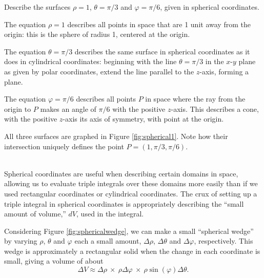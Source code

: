 {Describe the surfaces $\rho=1$, $\theta = \pi/3$ and $\varphi = \pi/6$, given in spherical coordinates.
}
{The equation $\rho = 1$ describes all points in space that are 1 unit away from the origin: this is the sphere of radius 1, centered at the origin.

The equation $\theta = \pi/3$ describes the same surface in spherical coordinates as it does in cylindrical coordinates: beginning with the line $\theta = \pi/3$ in the $x$-$y$ plane as given by polar coordinates, extend the line parallel to the $z$-axis, forming a plane.

The equation $\varphi=\pi/6$ describes all points $P$ in space where the ray from the origin to $P$ makes an angle of $\pi/6$ with the positive $z$-axis. This describes a cone, with the positive $z$-axis its axis of symmetry, with point at the origin.

All three surfaces are graphed in Figure \ref{fig:spherical1}. Note how their intersection uniquely defines the point $P=(1,\pi/3,\pi/6)$.
}\\

Spherical coordinates are useful when describing certain domains in space, allowing us to evaluate triple integrals over these domains more easily than if we used rectangular coordinates or cylindrical coordinates. The crux of setting up a triple integral in spherical coordinates is appropriately describing the ``small amount of volume,'' $dV$, used in the integral.

Considering Figure \ref{fig:sphericalwedge}, we can make a small ``spherical wedge'' by varying $\rho$, $\theta$ and $\varphi$ each a small amount, $\Delta\rho$, $\Delta\theta$ and $\Delta\varphi$, respectively. This wedge is approximately a rectangular solid when the change in each coordinate is small, giving a volume of about
$$\Delta V \approx \Delta\rho\ \times\ \rho\Delta\varphi\ \times\ \rho\sin(\varphi)\Delta\theta.$$

